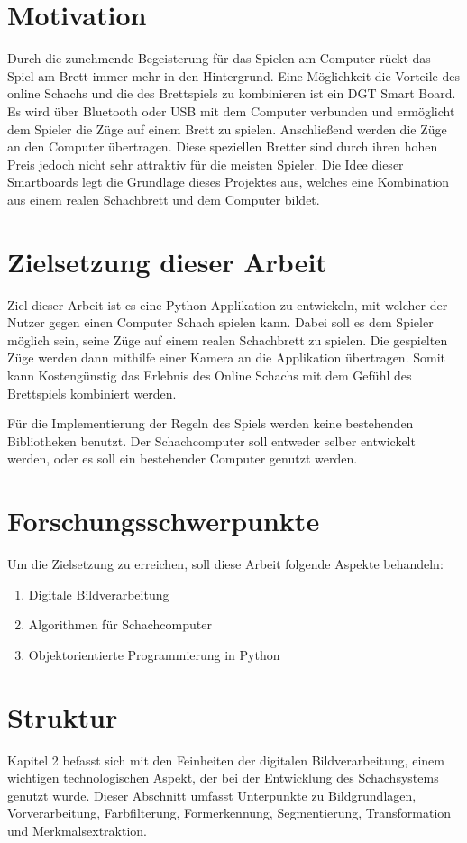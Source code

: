 \section{Motivation}
Durch die zunehmende Begeisterung für das Spielen am Computer rückt das Spiel am Brett immer mehr in den Hintergrund. 
Eine Möglichkeit die Vorteile des online Schachs und die des Brettspiels zu kombinieren ist ein DGT Smart Board. Es wird über Bluetooth 
oder USB mit dem Computer verbunden und ermöglicht dem Spieler die Züge auf einem Brett zu spielen. 
Anschließend werden die Züge an den Computer übertragen. Diese speziellen Bretter sind durch ihren hohen Preis jedoch nicht sehr attraktiv für die meisten Spieler. 
Die Idee dieser Smartboards legt die Grundlage dieses Projektes aus, welches eine Kombination aus einem realen Schachbrett und dem Computer bildet.

\section{Zielsetzung dieser Arbeit}
Ziel dieser Arbeit ist es eine Python Applikation zu entwickeln, mit welcher der Nutzer gegen einen Computer Schach spielen kann. 
Dabei soll es dem Spieler möglich sein, seine Züge auf einem realen Schachbrett zu spielen. Die gespielten Züge werden dann 
mithilfe einer Kamera an die Applikation übertragen. Somit kann Kostengünstig das Erlebnis des Online Schachs mit dem Gefühl des 
Brettspiels kombiniert werden.

Für die Implementierung der Regeln des Spiels werden keine bestehenden Bibliotheken benutzt. Der Schachcomputer soll entweder selber entwickelt werden,
oder es soll ein bestehender Computer genutzt werden.

\pagebreak
\section{Forschungsschwerpunkte}
Um die Zielsetzung zu erreichen, soll diese Arbeit folgende Aspekte behandeln:

\begin{enumerate}
    \item Digitale Bildverarbeitung
    \item Algorithmen für Schachcomputer
    \item Objektorientierte Programmierung in Python
\end{enumerate}
 
\section{Struktur}
Kapitel 2 befasst sich mit den Feinheiten der digitalen Bildverarbeitung, einem wichtigen technologischen Aspekt, 
der bei der Entwicklung des Schachsystems genutzt wurde. Dieser Abschnitt umfasst Unterpunkte zu Bildgrundlagen, Vorverarbeitung, Farbfilterung, 
Formerkennung, Segmentierung, Transformation und Merkmalsextraktion.

